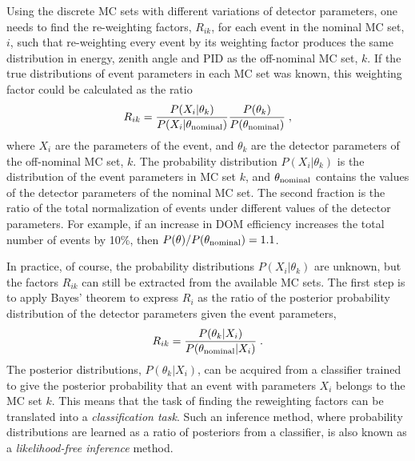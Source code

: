 Using the discrete MC sets with different variations of detector parameters, one needs to find the re-weighting factors, $R_{ik}$, for each event in the nominal MC set, $i$, such that re-weighting every event by its weighting factor produces the same distribution in energy, zenith angle and PID as the off-nominal MC set, $k$. If the true distributions of event parameters in each MC set was known, this weighting factor could be calculated as the ratio
\begin{equation}
    R_{ik} = \frac{P(X_i|\theta_k)}{P(X_i|\theta_{\rm nominal})} \frac{P(\theta_k)}{P(\theta_{\rm nominal})}\;, \label{eq:ratio-likelihood}
\end{equation}
where $X_i$ are the parameters of the event, and $\theta_k$ are the detector parameters of the off-nominal MC set, $k$. The probability distribution $P(X_i|\theta_k)$ is the distribution of the event parameters in MC set $k$, and $\theta_{\rm nominal}$ contains the values of the detector parameters of the nominal MC set. The second fraction is the ratio of the total normalization of events under different values of the detector parameters. For example, if an increase in DOM efficiency increases the total number of events by 10\%, then $P(\theta) / P(\theta_{\rm nominal}) = 1.1$.

In practice, of course, the probability distributions $P(X_i|\theta_k)$ are unknown, but the factors $R_{ik}$  can still be extracted from the available MC sets.
The first step is to apply Bayes' theorem to express $R_i$ as the ratio of the posterior probability distribution of the detector parameters given the event parameters,
\begin{equation}
    R_{ik} = \frac{P(\theta_k|X_i)}{P(\theta_{\rm nominal}|X_i)}\;. \label{eq:ratio-posterior}
\end{equation}
The posterior distributions, $P(\theta_k|X_i)$, can be acquired from a classifier trained to give the posterior probability that an event with parameters $X_i$ belongs to the MC set $k$. This means that the task of finding the reweighting factors can be translated into a \emph{classification task}. Such an inference method, where probability distributions are learned as a ratio of posteriors from a classifier, is also known as a \emph{likelihood-free inference} method.

